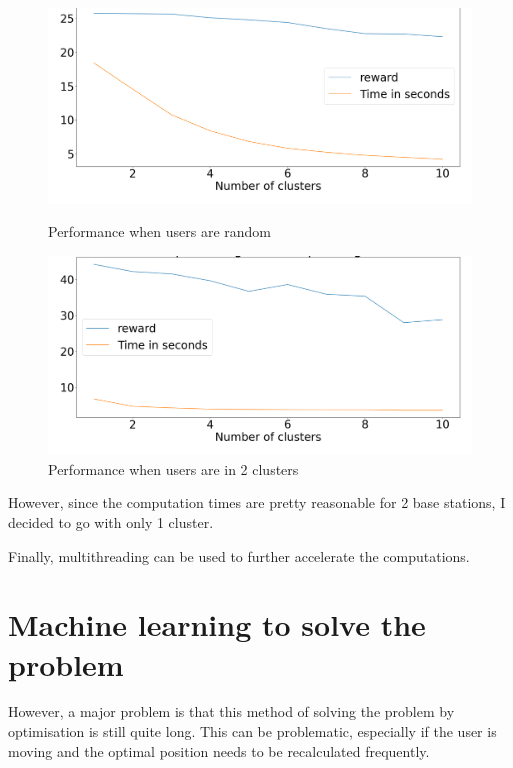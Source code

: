 \documentclass[letterpaper]{article}
\begin{document}
\begin{figure}[H]
    \centering
    \begin{minipage}[b]{0.45\textwidth}
        \centering
        \includegraphics[width=\textwidth]{images/Performance_opt_function_clusters.png}
        \caption{Performance when users are random}
    \end{minipage}
    \hspace{0.05\textwidth}
    \begin{minipage}[b]{0.45\textwidth}
        \centering
        \includegraphics[width=\textwidth]{images/Performance_opt_function_clusters_when_2clusters.png}
        \caption{Performance when users are in 2 clusters}
    \end{minipage}
\end{figure}

However, since the computation times are pretty reasonable for 2 base stations, I decided to go with only 1 cluster.

Finally, multithreading can be used to further accelerate the computations.

\section{Machine learning to solve the problem}

However, a major problem is that this method of solving the problem by optimisation is still quite long.
This can be problematic, especially if the user is moving and the optimal position needs to be recalculated frequently.
\end{document}
